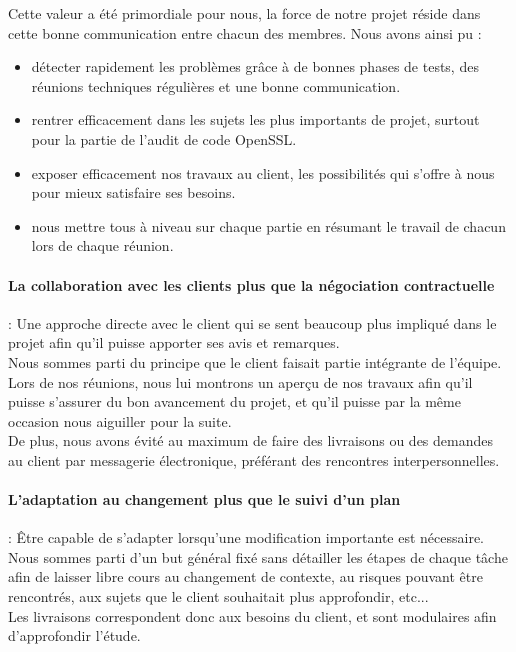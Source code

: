 Cette valeur a été primordiale pour nous, la force de notre projet réside dans cette bonne communication entre chacun des membres. Nous avons ainsi pu :
\begin{itemize}
\item détecter rapidement les problèmes grâce à de bonnes phases de tests, des réunions techniques régulières et une bonne communication.
\item rentrer efficacement dans les sujets les plus importants de projet, surtout pour la partie de l'audit de code OpenSSL.
\item exposer efficacement nos travaux au client, les possibilités qui s'offre à nous pour mieux satisfaire ses besoins.
\item nous mettre tous à niveau sur chaque partie en résumant le travail de chacun lors de chaque réunion.
\end{itemize}

\paragraph{La collaboration avec les clients plus que la négociation contractuelle} : Une approche directe avec le client qui se sent beaucoup plus impliqué dans le projet afin qu'il puisse apporter ses avis et remarques.\\

Nous sommes parti du principe que le client faisait partie intégrante de l'équipe. Lors de nos réunions, nous lui montrons un aperçu de nos travaux afin qu'il puisse s'assurer du bon avancement du projet, et qu'il puisse par la même occasion nous aiguiller pour la suite.\\

De plus, nous avons évité au maximum de faire des livraisons ou des demandes au client par messagerie électronique, préférant des rencontres interpersonnelles.


\paragraph{L'adaptation au changement plus que le suivi d'un plan} :
Être capable de s'adapter lorsqu'une modification importante est nécessaire.\\

Nous sommes parti d'un but général fixé sans détailler les étapes de chaque tâche afin de laisser libre cours au changement de contexte, au risques pouvant être rencontrés, aux sujets que le client souhaitait plus approfondir, etc...\\
Les livraisons correspondent donc aux besoins du client, et sont modulaires afin d'approfondir l'étude.

